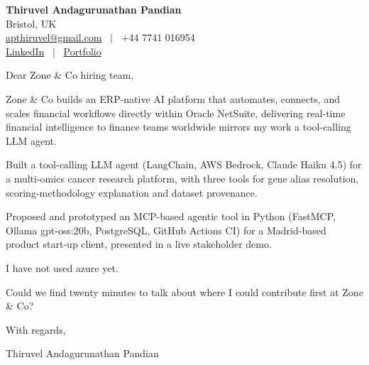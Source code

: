 \documentclass[11pt,a4paper]{article}
\begin{document}
\raggedright
\pagestyle{empty}

\begin{center}
    {\LARGE \color{linkblue} \textbf{Thiruvel Andagurunathan Pandian}}\\[0.2cm]
    Bristol, UK \\
    \href{mailto:apthiruvel@gmail.com}{apthiruvel@gmail.com} \ $|$ \ +44 7741 016954 \\
\href{https://www.linkedin.com/in/thiruvel-a-p/}{LinkedIn} \ $|$ \ \href{https://thiruvel-ap.github.io/PersonalPortfolio/}{Portfolio}
\end{center}

\vspace{0.4cm}

\noindent
Dear Zone \& Co hiring team,

Zone \& Co builds an ERP-native AI platform that automates, connects, and scales financial workflows directly within Oracle NetSuite, delivering real-time financial intelligence to finance teams worldwide mirrors my work a tool-calling LLM agent.

Built a tool-calling LLM agent (LangChain, AWS Bedrock, Claude Haiku 4.5) for a multi-omics cancer research platform, with three tools for gene alias resolution, scoring-methodology explanation and dataset provenance.

Proposed and prototyped an MCP-based agentic tool in Python (FastMCP, Ollama gpt-oss:20b, PostgreSQL, GitHub Actions CI) for a Madrid-based product start-up client, presented in a live stakeholder demo.

I have not used azure yet.

Could we find twenty minutes to talk about where I could contribute first at Zone \& Co?

\vspace{0.5cm}

With regards,

Thiruvel Andagurunathan Pandian
\end{document}
